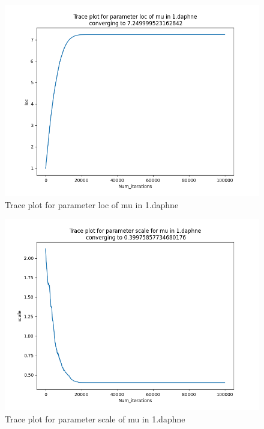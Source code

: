 \documentclass{article}
\begin{document}
\begin{enumerate}
\begin{figure}[!ht]
	\centering
	\includegraphics[scale=0.5]{../figs/1_daphne_loc_trace}
	\caption{Trace plot for parameter loc of mu in 1.daphne}
\end{figure}

\newpage
\begin{figure}[!ht]
	\centering
	\includegraphics[scale=0.5]{../figs/1_daphne_scale_trace}
	\caption{Trace plot for parameter scale of mu in 1.daphne}
\end{figure}


\end{enumerate}
\end{document}
